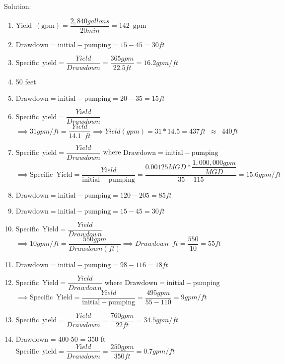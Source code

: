 \documentclass{article}
\begin{document}
Solution:\\

\begin{enumerate}
\item $\mathrm{Yield \enspace (gpm)}=\dfrac{2,840 gallons}{20 min}=\boxed{142 \enspace \mathrm{gpm}}$

\item 
$\mathrm{Drawdown} = \mathrm{initial-pumping} = 15 - 45 = \boxed{30 ft}$
\item 
$\mathrm{Specific \enspace yield} = \dfrac{Yield}{Drawdown}=\dfrac{365 gpm}{22.5 ft}=\boxed{16.2 gpm/ft}$
\item 
50 feet
\item 
$\mathrm{Drawdown} = \mathrm{initial-pumping} = 20 - 35 = \boxed{15 ft}$
\item 
$\mathrm{Specific \enspace  yield} = \dfrac{Yield}{Drawdown}$\\
\vspace{0.2cm}
$\implies 31 gpm/ft=\dfrac{Yield}{14.1 \enspace ft} \implies Yield (gpm)=31*14.5=\boxed{437 ft \enspace \approx \enspace 440 ft}$
\item 
$\mathrm{Specific \enspace yield} = \dfrac{Yield}{Drawdown}$ where $\mathrm{Drawdown} = \mathrm{initial-pumping}$\\
\vspace{0.2cm}
$\implies \mathrm{Specific \enspace Yield} = \dfrac{Yield}{\mathrm{initial-pumping}}=\dfrac{0.00125 MGD * \dfrac{1,000,000 gpm}{MGD}}{35-115}=\boxed{15.6 gpm/ft}$
\item 
$\mathrm{Drawdown} = \mathrm{initial-pumping} = 120 - 205 = \boxed{85 ft}$
\item 
$\mathrm{Drawdown} = \mathrm{initial-pumping} = 15 - 45 = \boxed{30 ft}$
\vspace{0.2cm}
\item 
$\mathrm{Specific \enspace  Yield} = \dfrac{Yield}{Drawdown}$\\
\vspace{0.2cm}
$\implies 10 gpm/ft=\dfrac{550 gpm}{Drawdown (ft)} \implies Drawdown \enspace ft=\dfrac{550}{10}=\boxed{55 ft}$
\vspace{0.2cm}
\item 
$\mathrm{Drawdown} = \mathrm{initial-pumping} = 98 - 116 = \boxed{18 ft}$
\item 
$\mathrm{Specific \enspace Yield} = \dfrac{Yield}{Drawdown}$ where $\mathrm{Drawdown} = \mathrm{initial-pumping}$\\
\vspace{0.2cm}
$\implies \mathrm{Specific \enspace Yield} = \dfrac{Yield}{\mathrm{initial-pumping}}=\dfrac{495 gpm}{55-110}=\boxed{9 gpm/ft}$
\item 
$\mathrm{Specific \enspace yield} = \dfrac{Yield}{Drawdown}=\dfrac{760 gpm}{22 ft}=\boxed{34.5 gpm/ft}$
\vspace{0.2cm}
\item 
Drawdown = 400-50 = 350 ft\\
\vspace{0.2cm}
$\mathrm{Specific \enspace yield} = \dfrac{Yield}{Drawdown}=\dfrac{250 gpm}{350 ft}=\boxed{0.7 gpm/ft}$

\end{enumerate}
\end{document}
